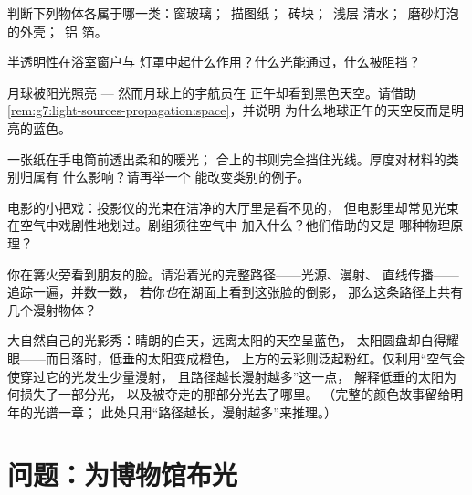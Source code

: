 \begin{exercise}[$\star$]\label{exo:g7:light-sources-propagation:6}
判断下列物体各属于哪一类：窗玻璃；\ 描图纸；\ 砖块；\ 浅层
清水；\ 磨砂灯泡的外壳；\ 铝
箔。
\end{exercise}

\begin{exercise}[$\star$]\label{exo:g7:light-sources-propagation:7}
半透明性在浴室窗户与
灯罩中起什么作用？什么光能通过，什么被阻挡？
\end{exercise}

\begin{exercise}[$\star$]\label{exo:g7:light-sources-propagation:8}
月球被阳光照亮 --- 然而月球上的宇航员在
正午却看到黑色天空。请借助
\cref{rem:g7:light-sources-propagation:space}，并说明
为什么地球正午的天空反而是明亮的蓝色。
\end{exercise}

\begin{exercise}[$\star\star$]\label{exo:g7:light-sources-propagation:9}
一张纸在手电筒前透出柔和的暖光；
合上的书则完全挡住光线。厚度对材料的类别归属有
什么影响？请再举一个
能改变类别的例子。
\end{exercise}

\begin{exercise}[$\star\star$]\label{exo:g7:light-sources-propagation:10}
电影的小把戏：投影仪的光束在洁净的大厅里是看不见的，
但电影里却常见光束在空气中戏剧性地划过。剧组须往空气中
加入什么？他们借助的又是
哪种物理原理？
\end{exercise}

\begin{exercise}[$\star\star$]\label{exo:g7:light-sources-propagation:11}
你在篝火旁看到朋友的脸。请沿着光的完整路径——光源、漫射、
直线传播——追踪一遍，并数一数，
若你\emph{也}在湖面上看到这张脸的倒影，
那么这条路径上共有几个漫射物体？
\end{exercise}

\begin{exercise}[$\star\star\star$]\label{exo:g7:light-sources-propagation:12}
大自然自己的光影秀：晴朗的白天，远离太阳的天空呈蓝色，
太阳圆盘却白得耀眼——而日落时，低垂的太阳变成橙色，
上方的云彩则泛起粉红。仅利用“空气会使穿过它的光发生少量漫射，
且路径越长漫射越多”这一点，
解释低垂的太阳为何损失了一部分光，
以及被夺走的那部分光去了哪里。
（完整的颜色故事留给明年的光谱一章；
此处只用“路径越长，漫射越多”来推理。）
\end{exercise}

\section{问题：为博物馆布光}

